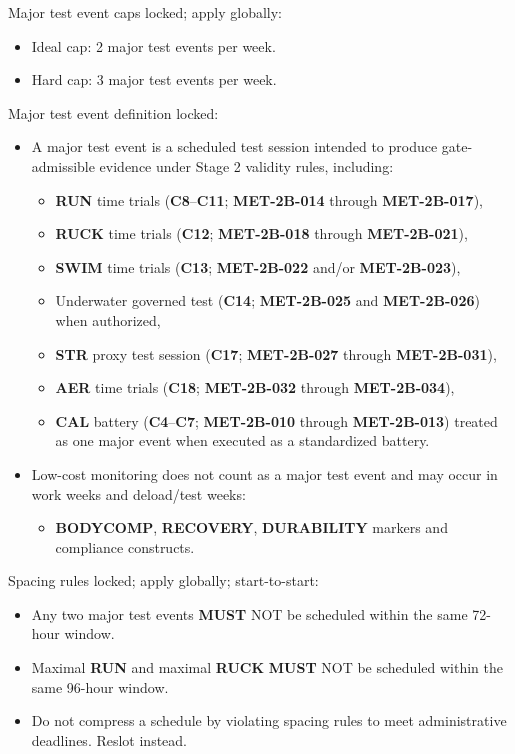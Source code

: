 \documentclass[10pt]{article}
\begin{document}
Major test event caps locked; apply globally:

\begin{itemize}
\item Ideal cap: 2 major test events per week.
\item Hard cap: 3 major test events per week.
\end{itemize}

Major test event definition locked:

\begin{itemize}
\item A major test event is a scheduled test session intended to produce gate-admissible evidence under Stage 2 validity rules, including:
  \begin{itemize}
  \item \textbf{RUN} time trials (\textbf{C8}–\textbf{C11}; \textbf{MET-2B-014} through \textbf{MET-2B-017}),
  \item \textbf{RUCK} time trials (\textbf{C12}; \textbf{MET-2B-018} through \textbf{MET-2B-021}),
  \item \textbf{SWIM} time trials (\textbf{C13}; \textbf{MET-2B-022} and/or \textbf{MET-2B-023}),
  \item Underwater governed test (\textbf{C14}; \textbf{MET-2B-025} and \textbf{MET-2B-026}) when authorized,
  \item \textbf{STR} proxy test session (\textbf{C17}; \textbf{MET-2B-027} through \textbf{MET-2B-031}),
  \item \textbf{AER} time trials (\textbf{C18}; \textbf{MET-2B-032} through \textbf{MET-2B-034}),
  \item \textbf{CAL} battery (\textbf{C4}–\textbf{C7}; \textbf{MET-2B-010} through \textbf{MET-2B-013}) treated as one major event when executed as a standardized battery.
  \end{itemize}
\item Low-cost monitoring does not count as a major test event and may occur in work weeks and deload/test weeks:
  \begin{itemize}
  \item \textbf{BODYCOMP}, \textbf{RECOVERY}, \textbf{DURABILITY} markers and compliance constructs.
  \end{itemize}
\end{itemize}

Spacing rules locked; apply globally; start-to-start:

\begin{itemize}
\item Any two major test events \textbf{MUST} NOT be scheduled within the same 72-hour window.
\item Maximal \textbf{RUN} and maximal \textbf{RUCK} \textbf{MUST} NOT be scheduled within the same 96-hour window.
\item Do not compress a schedule by violating spacing rules to meet administrative deadlines. Reslot instead.
\end{itemize}
\end{document}
